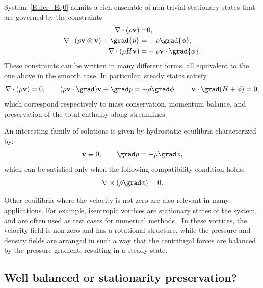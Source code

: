 \documentclass[a4paper,10pt]{article}
\begin{document}
System~\eqref{Euler_Eq0} admits a rich ensemble  of  non-trivial stationary states that are governed by  the constraints
\begin{equation}\label{Euler_Eq6}
\begin{split}
	 \nabla \cdot (\rho \mathbf{v}) =  &0, \\
	 \nabla \cdot (\rho \mathbf{v} \otimes \mathbf{v}) + \grad{p} = &-\rho \grad{\phi}, \\
	  \nabla \cdot (\rho H \mathbf{v}) = &-\rho \mathbf{v} \cdot \grad{\phi}.
\end{split}
\end{equation}
These constraints can be written in many different forms, all equivalent to the one above in the smooth case.
In particular,  steady states satisfy
\begin{equation}\label{eq:stationary-state}
	\nabla \cdot (\rho \mathbf{v}) = 0, \qquad
	(\rho \mathbf{v} \cdot \grad)\mathbf{v} + \grad p = -\rho \grad\phi, \qquad
	\mathbf{v} \cdot \grad (H + \phi) = 0,
\end{equation}
which correspond respectively to mass conservation, momentum balance, and preservation of the total enthalpy along streamlines. 

An interesting family of solutions is given by  hydrostatic equilibria characterized by:
\begin{equation}
	\mathbf{v} \equiv 0, 
	\qquad \grad p = - \rho \grad \phi,
\end{equation}
which can be satisfied only when the following compatibility condition holds:
\begin{equation}
	\nabla \times (\rho \grad \phi) = 0.
\end{equation}

Other equilibria where the velocity is not zero are also relevant in many applications. For example, isentropic vortices are stationary states of the system, and are often used as test cases for numerical methods \cite{ricchiuto2021analytical,barsukow2025genuinely}. In these vortices, the velocity field is non-zero and has a rotational structure, while the pressure and density fields are arranged in such a way that the centrifugal forces are balanced by the pressure gradient, resulting in a steady state.


\subsection{Well balanced or stationarity preservation?}
\end{document}
